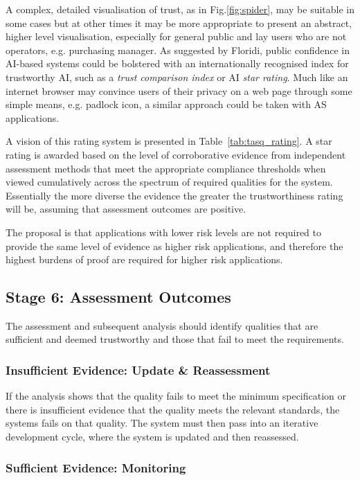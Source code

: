 A complex, detailed visualisation of trust, as in Fig.\ref{fig:spider}, may be suitable in some cases but at other times it may be more appropriate to present an abstract, higher level visualisation, especially for general public and lay users who are not operators, e.g. purchasing manager. 
%
As suggested by Floridi, public confidence in AI-based systems could be bolstered with an internationally recognised index for trustworthy AI, such as a \emph{trust comparison index} or AI \emph{star rating}. Much like an internet browser may convince users of their privacy on a web page through some simple means, e.g. padlock icon, a similar approach could be taken with AS applications. 

A vision of this rating system is presented in Table~\ref{tab:tasq_rating}. 
%
A star rating is awarded based on the level of corroborative evidence from independent assessment methods that meet the appropriate compliance thresholds when viewed cumulatively across the spectrum of required qualities for the system. 
%
Essentially the more diverse the evidence the greater the trustworthiness rating will be, assuming that assessment outcomes are positive. 

The proposal is that applications with lower risk levels are not required to provide the same level of evidence as higher risk applications, and therefore the highest burdens of proof are required for higher risk applications. 



\subsection{Stage 6: Assessment Outcomes}

The assessment and subsequent analysis should identify qualities that are sufficient and deemed trustworthy and those that fail to meet the requirements. 

\subsubsection{Insufficient Evidence: Update \& Reassessment}

If the analysis shows that the quality fails to meet the minimum specification or there is insufficient evidence that the quality meets the relevant standards, the systems fails on that quality. The system must then pass into an iterative development cycle, where the system is updated and then reassessed. 

\subsubsection{Sufficient Evidence: Monitoring}

